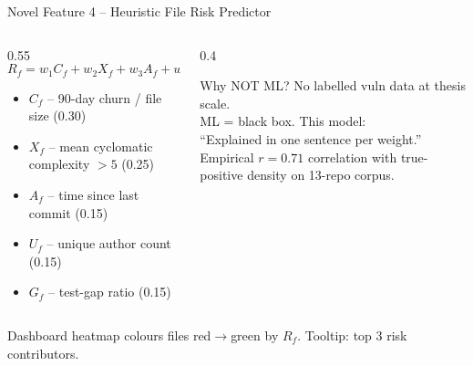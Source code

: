 \documentclass[aspectratio=169,12pt]{beamer}
\begin{document}
\begin{frame}{Novel Feature 4 -- Heuristic File Risk Predictor}
  \begin{columns}[T]
    \begin{column}{0.55\textwidth}
      \begin{equation*}
        R_f = w_1 C_f + w_2 X_f + w_3 A_f + w_4 U_f + w_5 G_f
      \end{equation*}
      \vspace{-4pt}
      \begin{itemize}\small
        \item $C_f$ -- 90-day churn / file size (0.30)
        \item $X_f$ -- mean cyclomatic complexity $>5$ (0.25)
        \item $A_f$ -- time since last commit (0.15)
        \item $U_f$ -- unique author count (0.15)
        \item $G_f$ -- test-gap ratio (0.15)
      \end{itemize}
    \end{column}
    \begin{column}{0.4\textwidth}
      \begin{block}{Why NOT ML?}
        No labelled vuln data at thesis scale.\\
        ML = black box. This model:\\
        ``Explained in one sentence per weight.''\\
        Empirical $r = 0.71$ correlation with
        true-positive density on 13-repo corpus.
      \end{block}
    \end{column}
  \end{columns}
  \vspace{4pt}
  Dashboard heatmap colours files red\(\rightarrow\)green by $R_f$. Tooltip: top 3 risk contributors.
\end{frame}
\end{document}
